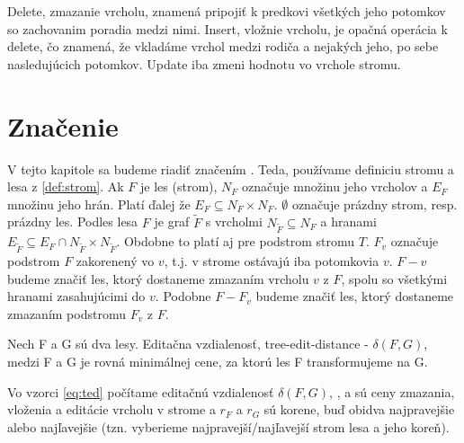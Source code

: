 Delete, zmazanie vrcholu, znamená pripojiť k predkovi všetkých jeho potomkov so
zachovanim poradia medzi nimi. Insert, vložnie vrcholu, je opačná operácia k
delete, čo znamená, že vkladáme vrchol medzi rodiča a nejakých jeho, po sebe
nasledujúcich potomkov. Update iba zmeni hodnotu vo vrchole stromu.

\section{Značenie}

V tejto kapitole sa budeme riadiť značením \citet{RTED}. Teda, používame definiciu
stromu a lesa z \ref{def:strom}. Ak $F$ je les (strom), $N_F$ označuje množinu jeho vrcholov a $E_F$
množinu jeho hrán. Platí ďalej že $E_F \subseteq N_F \times N_F$. $\emptyset$ označuje
prázdny strom, resp. prázdny les. Podles lesa $F$ je graf $\tilde{F}$ s vrcholmi
$N_{\tilde{F}} \subseteq N_F$ a hranami $E_{\tilde{F}} \subseteq E_F \cap N_{\tilde{F}} \times N_{\tilde{F}}$.
Obdobne to platí aj pre podstrom stromu $T$.
$F_{v}$ označuje podstrom $F$ zakorenený vo $v$, t.j. v strome ostávajú iba potomkovia $v$.
$F - v$ budeme značiť les, ktorý dostaneme zmazaním vrcholu $v$ z $F$, spolu so všetkými hranami
zasahujúcimi do $v$. Podobne $F - F_{v}$ budeme značiť les, ktorý dostaneme zmazaním podstromu
$F_{v}$ z $F$.

\begin{definice}
	Nech F a G sú dva lesy. Editačna vzdialenosť, tree-edit-distance - $\delta(F, G)$,
	medzi F a G je rovná minimálnej cene, za ktorú les F transformujeme na G.
\end{definice}

Vo vzorci \ref{eq:ted} počítame editačnú vzdialenosť $\delta(F, G)$,
\Cdel, \Cins a \Cupd sú ceny zmazania, vloženia a editácie vrcholu v strome
a $r_{F}$ a $r_{G}$ sú korene, buď obidva najpravejšie alebo najľavejšie (tzn. vyberieme
najpravejší/najľavejší strom lesa a jeho koreň).

